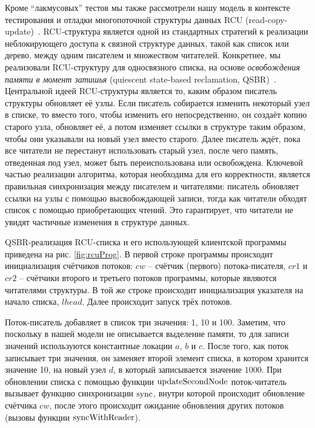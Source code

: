 Кроме ``лакмусовых'' тестов мы также рассмотрели нашу модель в контексте тестирования и отладки
многопоточной структуры данных RCU\label{acr:rcu} (read-copy-update)~\cite{McKenney-Slingwine:PDCS98,McKenney:PhD}.
RCU-структура является одной из стандартных стратегий к реализации неблокирующего доступа к
связной структуре данных, такой как список или дерево, между одним писателем и множеством читателей.
Конкретнее, мы реализовали RCU-структуру для односвязного списка, на основе
\emph{освобождения памяти в момент затишья} (quiescent state-based reclamation, QSBR)\label{acr:qsbr}~\cite{Desnoyers-al:TPDS12}.
Центральной идеей RCU-структуры является то, каким образом писатель структуры обновляет её узлы.
Если писатель собирается изменить некоторый узел в списке, то вместо того, чтобы
изменить его непосредственно, он создаёт копию старого узла, обновляет её, а потом изменяет ссылки в структуре
таким образом, чтобы они указывали на новый узел вместо старого.
Далее писатель ждёт, пока все читатели не перестанут использовать старый узел, после чего
память, отведенная под узел, может быть переиспользована или освобождена.
Ключевой частью реализации алгоритма, которая необходима для его корректности, является
правильная синхронизация между писателем и читателями:
писатель обновляет ссылки на узлы с помощью высвобождающей записи,
тогда как читатели обходят список с помощью приобретающих чтений.
Это гарантирует, что читатели не увидят частичные изменения в структуре данных.

QSBR-реализация RCU-списка и его использующей клиентской программы приведена на рис. \ref{fig:rcuProg}.
В первой строке программы происходит инициализация счётчиков потоков:
$cw$ -- счётчик (первого) потока-писателя,
$cr1$ и $cr2$ -- счётчики второго и третьего потоков программы, которые являются читателями структуры.
В той же строке происходит инициализация указателя на начало списка, $lhead$.
Далее происходит запуск трёх потоков.

Поток-писатель добавляет в список три значения: 1, 10 и 100.
Заметим, что поскольку в нашей модели не описывается выделение памяти, то для записи значений используются константные локации $a$, $b$ и $c$.
После того, как поток записывает три значения, он заменяет второй элемент списка, в котором хранится значение 10,
на новый узел $d$, в который записывается значение $1000$.
При обновлении списка с помощью функции ${\rm updateSecondNode}$
поток-читатель вызывает функцию синхронизации ${\rm sync}$, внутри которой происходит обновление
счётчика $cw$, после этого происходит ожидание обновления других потоков (вызовы функции ${\rm syncWithReader}$).

